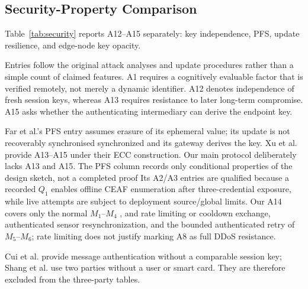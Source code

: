 \documentclass[cmc,article,submit,moreauthors,pdftex]{Definitions/tsp}
\providecommand{\DIFadd}[1]{{\protect\color{blue} \sf #1}} %
\providecommand{\DIFdel}[1]{{\protect\color{red} \scriptsize #1}} %
\providecommand{\DIFaddbegin}{} %
\providecommand{\DIFaddend}{} %
\providecommand{\DIFdelbegin}{} %
\providecommand{\DIFdelend}{} %
\begin{document}
\subsection{Security-Property Comparison}

Table~\ref{tab:security} reports A12--A15 separately: key independence, PFS, update resilience, and edge-node key opacity.

Entries follow the original attack analyses and update procedures rather than a simple count of claimed features. A1 requires a cognitively evaluable factor that is verified remotely, not merely a dynamic identifier. A12 denotes independence of fresh session keys, whereas A13 requires resistance to later long-term compromise. A15 asks whether the authenticating intermediary can derive the endpoint key.

Far et al.'s PFS entry assumes erasure of its ephemeral value; its update is not recoverably \DIFdelbegin \DIFdel{synchronised }\DIFdelend \DIFaddbegin \DIFadd{synchronized }\DIFaddend and its gateway derives the key. Xu et al. provide A13--A15 under their ECC construction. Our main protocol deliberately lacks A13 and A15. \DIFdelbegin \DIFdel{The PFS column records only conditional properties of the design sketch, not a completed proof}\DIFdelend \DIFaddbegin \DIFadd{Its A2/A3 entries are qualified because a recorded $Q_1$ enables offline CEAF enumeration after three-credential exposure, while live attempts are subject to deployment source/global limits}\DIFaddend . Our A14 covers \DIFdelbegin \DIFdel{only }\DIFdelend \DIFaddbegin \DIFadd{the normal }\DIFaddend $M_1$--$M_4$ \DIFdelbegin \DIFdel{, and rate limiting or cooldown }\DIFdelend \DIFaddbegin \DIFadd{exchange, authenticated sensor resynchronization, and the bounded authenticated retry of $M_5$--$M_6$; rate limiting }\DIFaddend does not justify marking A8 as full DDoS resistance.

Cui et al. \cite{cui} provide message authentication without a comparable session key; Shang et al. \cite{shang} use two parties without a user or smart card. They are therefore excluded from the three-party tables.
\end{document}
